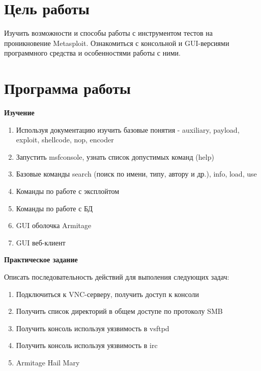 \documentclass[a4paper]{article}
\begin{document}
\vfill %


\tableofcontents
\newpage



\section{Цель работы}

Изучить возможности и способы работы с инструментом тестов на проникновение Metasploit. Ознакомиться с консольной и GUI-версиями программного средства и особенностями работы с ними.

\section{Программа работы}

\textbf{Изучение}

\begin{enumerate}

\item Используя документацию изучить базовые понятия - auxiliary, payload, exploit, shellcode, nop, encoder

\item Запустить msfconsole, узнать список допустимых команд (help)

\item Базовые команды search (поиск по имени, типу, автору и др.), info, load, use

\item Команды по работе с эксплойтом

\item Команды по работе с БД

\item GUI оболочка Armitage

\item GUI веб-клиент

\end{enumerate}

\textbf{Практическое задание}

Описать последовательность действий для выполения следующих задач:

\begin{enumerate}

\item Подключиться к VNC-серверу, получить доступ к консоли

\item Получить список директорий в общем доступе по протоколу SMB

\item Получить консоль используя уязвимость в vsftpd

\item Получить консоль используя уязвимость в irc

\item Armitage Hail Mary

\end{enumerate}
\end{document}
